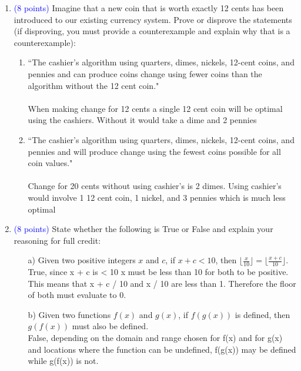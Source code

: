 \documentclass{article}
\newcommand{\pt}[1]{\textcolor{blue}{(#1 points)}}
\begin{document}
\begin{enumerate}
\item \pt{8} Imagine that a new coin that is worth exactly 12 cents has been introduced to our existing currency system. Prove or disprove the statements (if disproving, you must provide a counterexample and explain why that is a counterexample):
\begin{enumerate}
    \item ``The cashier's algorithm using quarters, dimes, nickels,  12-cent coins, and pennies and can produce coins change using fewer coins than the algorithm without the 12 cent coin."\\\\
    When making change for 12 cents a single 12 cent coin will be optimal using the cashiers. Without it would take a dime and 2 pennies
    \item ``The cashier's algorithm using quarters, dimes, nickels,  12-cent coins, and pennies and will produce change using the fewest coins possible for all coin values."\\\\
    Change for 20 cents without using cashier's is 2 dimes. Using cashier's would involve 1 12 cent coin, 1 nickel, and 3 pennies which is much less optimal

\end{enumerate}

\item \pt{8} State whether the following is True or False and explain your reasoning for full credit:
\begin{enumerate}
    \item[a)] Given two positive integers $x$ and $c$, if $x + c < 10$, then $\lfloor \frac{x}{10} \rfloor = \lfloor \frac{x + c}{10} \rfloor$.\\
    True, since x + c is < 10 x must be less than 10 for both to be positive. This means that x + c / 10 and x / 10 are less than 1. Therefore the floor of both must evaluate to 0.
    \item[b)] Given two functions $f(x)$ and $g(x)$, if $f(g(x))$ is defined, then $g(f(x))$ must also be defined.\\
    False, depending on the domain and range chosen for f(x) and for g(x) and locations where the function can be undefined, f(g(x)) may be defined while g(f(x)) is not.
\end{enumerate}


\end{enumerate}
\end{document}
